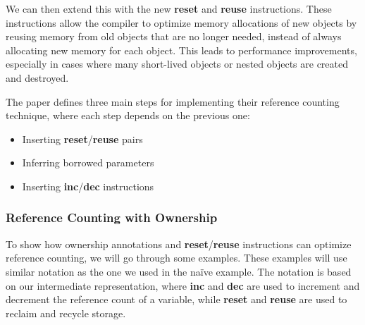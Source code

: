 We can then extend this with the new \textbf{reset} and \textbf{reuse} instructions. These instructions allow the compiler to optimize memory allocations of new objects by reusing memory from old objects that are no longer needed, instead of always allocating new memory for each object. This leads to performance improvements, especially in cases where many short-lived objects or nested objects are created and destroyed.

The paper defines three main steps for implementing their reference counting technique, where each step depends on the previous one:

\begin{itemize}
    \item Inserting \textbf{reset}/\textbf{reuse} pairs
    \item Inferring borrowed parameters
    \item Inserting \textbf{inc}/\textbf{dec} instructions
\end{itemize}



\subsubsection{Reference Counting with Ownership}\label{section:beans:examples}

To show how ownership annotations and \textbf{reset}/\textbf{reuse} instructions can optimize reference counting, we will go through some examples. These examples will use similar notation as the one we used in the naïve example. The notation is based on our intermediate representation, where \textbf{inc} and \textbf{dec} are used to increment and decrement the reference count of a variable, while \textbf{reset} and \textbf{reuse} are used to reclaim and recycle storage.

